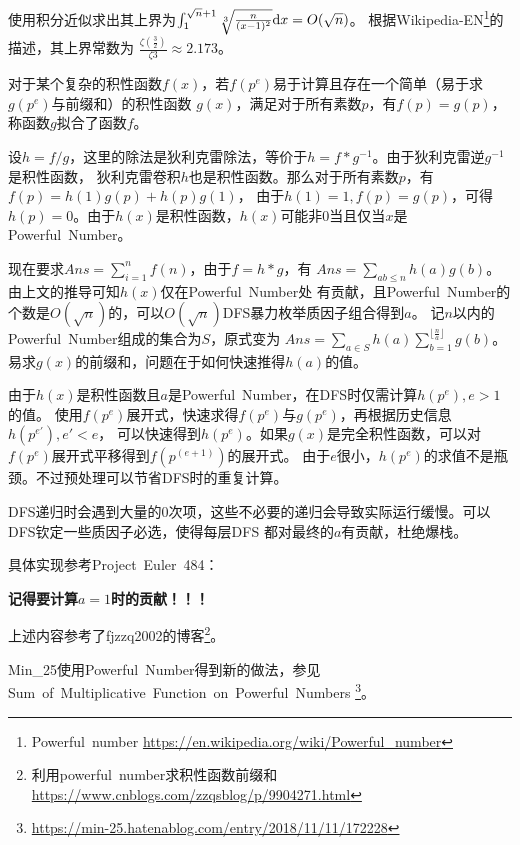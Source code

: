 使用积分近似求出其上界为$\int_1^{\sqrt{n}+1}{\sqrt[3]{\frac{n}{(x-1)^2}} \textrm{d} x}=O(\sqrt{n})$。
根据Wikipedia-EN\footnote{Powerful~number
    \url{https://en.wikipedia.org/wiki/Powerful\_number}}的描述，其上界常数为
    $\frac{\zeta(\frac{3}{2})}{\zeta{3}}\approx 2.173$。

对于某个复杂的积性函数$f(x)$，若$f(p^e)$易于计算且存在一个简单（易于求$g(p^e)$与前缀和）的积性函数
$g(x)$，满足对于所有素数$p$，有$f(p)=g(p)$，称函数$g$拟合了函数$f$。

设$h=f/g$，这里的除法是狄利克雷除法，等价于$h=f*g^{-1}$。由于狄利克雷逆$g^{-1}$是积性函数，
狄利克雷卷积$h$也是积性函数。那么对于所有素数$p$，有$f(p)=h(1)g(p)+h(p)g(1)$，
由于$h(1)=1,f(p)=g(p)$，可得$h(p)=0$。由于$h(x)$是积性函数，$h(x)$可能非0当且仅当$x$是
Powerful~Number。

现在要求$\displaystyle Ans=\sum_{i=1}^n{f(n)}$，由于$f=h*g$，有
$\displaystyle Ans=\sum_{ab\leq n}{h(a)g(b)}$。由上文的推导可知$h(x)$仅在Powerful~Number处
有贡献，且Powerful~Number的个数是$O(\sqrt{n})$的，可以$O(\sqrt{n})$DFS暴力枚举质因子组合得到$a$。
记$n$以内的Powerful~Number组成的集合为$S$，原式变为
$\displaystyle Ans=\sum_{a\in S}{h(a)\sum_{b=1}^{\lfloor \frac{n}{a} \rfloor}{g(b)}}$。
易求$g(x)$的前缀和，问题在于如何快速推得$h(a)$的值。

由于$h(x)$是积性函数且$a$是Powerful~Number，在DFS时仅需计算$h(p^e),e>1$的值。
使用$f(p^e)$展开式，快速求得$f(p^e)$与$g(p^e)$，再根据历史信息$h(p^{e'}),e'<e$，
可以快速得到$h(p^e)$。如果$g(x)$是完全积性函数，可以对$f(p^e)$展开式平移得到$f(p^(e+1))$的展开式。
由于$e$很小，$h(p^e)$的求值不是瓶颈。不过预处理可以节省DFS时的重复计算。

DFS递归时会遇到大量的0次项，这些不必要的递归会导致实际运行缓慢。可以DFS钦定一些质因子必选，使得每层DFS
都对最终的$a$有贡献，杜绝爆栈。

具体实现参考Project~Euler~484：


{\bfseries 记得要计算$a=1$时的贡献！！！}

上述内容参考了fjzzq2002的博客\footnote{
利用powerful~number求积性函数前缀和\\
    \url{https://www.cnblogs.com/zzqsblog/p/9904271.html}
}。

Min\_25使用Powerful~Number得到新的做法，参见
Sum~of~Multiplicative~Function~on~Powerful~Numbers
\footnote{\url{https://min-25.hatenablog.com/entry/2018/11/11/172228}}。
